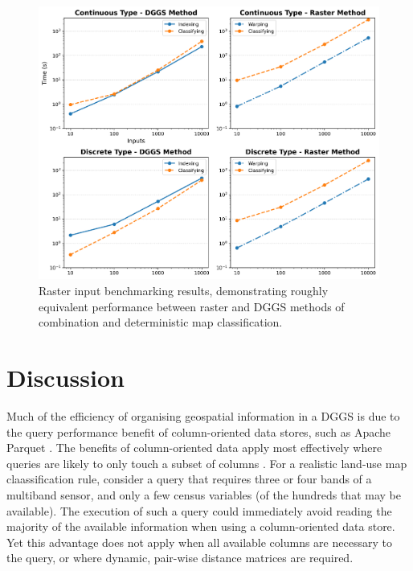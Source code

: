 \documentclass[]{interact}
\theoremstyle{plain}%
\theoremstyle{definition}
\theoremstyle{remark}
\begin{document}
\begin{figure}[t]
    \centering
    \includegraphics[width=0.65\linewidth]{images/raster-results.png}
    \caption{Raster input benchmarking results, demonstrating roughly equivalent performance between raster and \ac{DGGS} methods of combination and deterministic map classification.}
    \label{fig:BenchmarkRast}
\end{figure}

\section{Discussion}

Much of the efficiency of organising geospatial information in a \ac{DGGS} is due to the query performance benefit of column-oriented data stores, such as Apache Parquet \citep{abadi2008column,ivanov2020impact}. The benefits of column-oriented data apply most effectively where queries are likely to only touch a subset of columns \citep{abadi2008query}. For a realistic land-use map claassification rule, consider a query that requires three or four bands of a multiband sensor, and only a few census variables (of the hundreds that may be available). The execution of such a query could immediately avoid reading the majority of the available information when using a column-oriented data store. Yet this advantage does not apply when all available columns are necessary to the query, or where dynamic, pair-wise distance matrices are required.
\end{document}
